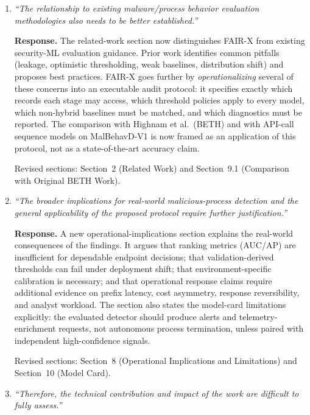\documentclass[11pt]{article}
\begin{document}
\begin{enumerate}[label=\textbf{Comment~\arabic*:},leftmargin=*,align=left]
\item \textit{``The relationship to existing malware/process behavior evaluation methodologies also needs to be better established.''}

\textbf{Response.} The related-work section now distinguishes FAIR-X from existing security-ML evaluation guidance. Prior work identifies common pitfalls (leakage, optimistic thresholding, weak baselines, distribution shift) and proposes best practices. FAIR-X goes further by \emph{operationalizing} several of these concerns into an executable audit protocol: it specifies exactly which records each stage may access, which threshold policies apply to every model, which non-hybrid baselines must be matched, and which diagnostics must be reported. The comparison with Highnam et al.~(BETH) and with API-call sequence models on MalBehavD-V1 is now framed as an application of this protocol, not as a state-of-the-art accuracy claim.

Revised sections: Section~2 (Related Work) and Section~9.1 (Comparison with Original BETH Work).

\item \textit{``The broader implications for real-world malicious-process detection and the general applicability of the proposed protocol require further justification.''}

\textbf{Response.} A new operational-implications section explains the real-world consequences of the findings. It argues that ranking metrics (AUC/AP) are insufficient for dependable endpoint decisions; that validation-derived thresholds can fail under deployment shift; that environment-specific calibration is necessary; and that operational response claims require additional evidence on prefix latency, cost asymmetry, response reversibility, and analyst workload. The section also states the model-card limitations explicitly: the evaluated detector should produce alerts and telemetry-enrichment requests, not autonomous process termination, unless paired with independent high-confidence signals.

Revised sections: Section~8 (Operational Implications and Limitations) and Section~10 (Model Card).

\item \textit{``Therefore, the technical contribution and impact of the work are difficult to fully assess.''}


\end{enumerate}
\end{document}
